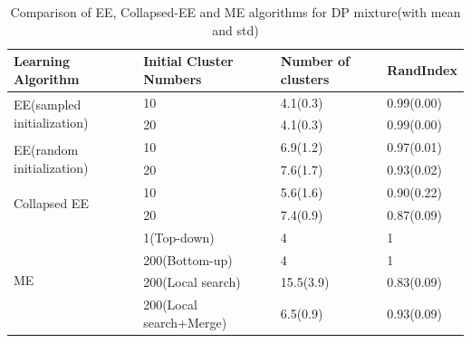 \documentclass{article}
\begin{document}
\begin{table}[t]
\caption{Comparison of EE, Collapsed-EE and ME algorithms for DP mixture(with mean and std)}
\begin{center}
\begin{tabular}{|l|l|l|l|}

\hline
{\bf Learning Algorithm} &{\bf Initial Cluster Numbers} &{\bf Number of clusters}  &{\bf RandIndex} \\ 
\hline 
\multirow{2}{*}{EE(sampled initialization)} & 10 & 4.1(0.3) & 0.99(0.00) \\
					    & 20 & 4.1(0.3) & 0.99(0.00)\\
\hline
\multirow{2}{*}{EE(random initialization)}  & 10 & 6.9(1.2)&  0.97(0.01) \\
					    & 20 & 7.6(1.7)&  0.93(0.02) \\
\hline
\multirow{2}{*}{Collapsed EE}               & 10 & 5.6(1.6)&  0.90(0.22) \\
					    & 20 & 7.4(0.9)&  0.87(0.09) \\
\hline
\multirow{4}{*}{ME}                         & 1(Top-down) &    4  &  1 \\
					    & 200(Bottom-up) & 4  &  1 \\
					    & 200(Local search) & 15.5(3.9)&  0.83(0.09) \\
					    & 200(Local search+Merge) & 6.5(0.9)&  0.93(0.09) \\
\hline
\end{tabular}
\end{center}
\end{table}
\end{document}
